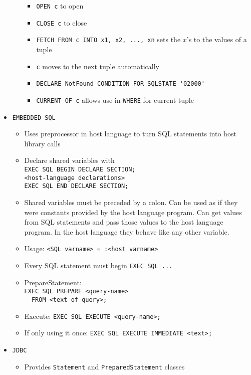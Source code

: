 \documentclass[landscape,8pt]{extarticle}
\newcommand{\code}{\lstinline}
\begin{document}
\begin{multicols}{4}
\begin{itemize}
\begin{itemize}
\begin{itemize}
            \item \code{OPEN c} to open
            \item \code{CLOSE c} to close
            \item \code{FETCH FROM c INTO x1, x2, ..., xn} sets the $x$'s to the values of a tuple
            \item \code{c} moves to the next tuple automatically
            \item \code{DECLARE NotFound CONDITION FOR SQLSTATE '02000'}
            \item \code{CURRENT OF c} allows use in \code{WHERE} for current tuple
        \end{itemize}
    \end{itemize}
    \item \code{EMBEDDED SQL}
    \begin{itemize}
        \item Uses preprocessor in host language to turn SQL statements into host library calls
        \item Declare shared variables with \\
\code{EXEC SQL BEGIN DECLARE SECTION;}\\
\code{<host-language declarations>}\\
\code{EXEC SQL END DECLARE SECTION;}
        \item Shared variables must be preceded by a colon. Can be used as if they were constants
        provided by the host language program. Can get values from SQL statements and pass those
        values to the host language program. In the host language they behave like any other
        variable.
        \item Usage: \code{<SQL varname> = :<host varname>}
        \item Every SQL statement must begin \code{EXEC SQL ...}
        \item PrepareStatement:\\
\code{EXEC SQL PREPARE <query-name>}\\
\code{  FROM <text of query>;}
        \item Execute: \code{EXEC SQL EXECUTE <query-name>;}
        \item If only using it once:
\code{EXEC SQL EXECUTE IMMEDIATE <text>;}
        \end{itemize}
        \item \code{JDBC}
    \begin{itemize}
        \item Provides \code{Statement} and \code{PreparedStatement} classes

\end{itemize}
\end{itemize}
\end{multicols}
\end{document}
